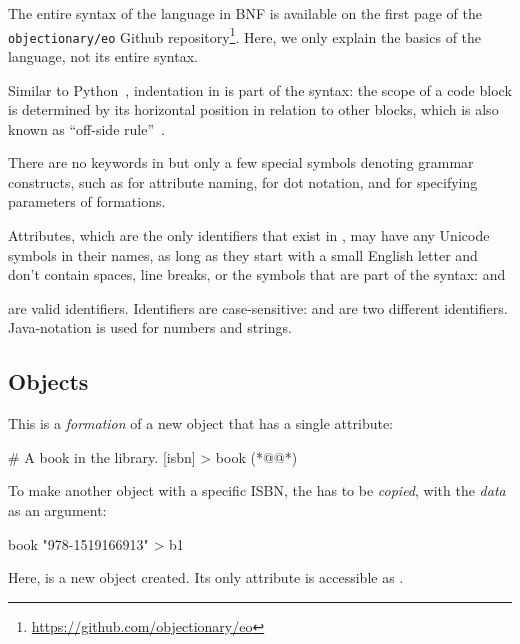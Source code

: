 
The entire syntax of the \eolang{} language in BNF is available on the first page of the
\texttt{objectionary/eo} Github repository\footnote{\url{https://github.com/objectionary/eo}}.
Here, we only explain the basics of the language, not its entire syntax.

Similar to Python~\citep{lutz2013learning}, indentation in \eolang{} is part of the syntax:
the scope of a code block is determined by its horizontal position
in relation to other blocks, which is also known as ``off-side rule''~\citep{landin1966next}.

There are no keywords in \eolang{} but only a few special symbols
denoting grammar constructs, such as \ff{>} for attribute naming,
 for dot notation, and \ff{[]} for specifying parameters of formations.

Attributes, which are the only identifiers that exist in \eolang{}, may have
any Unicode symbols in their names, as long as they start with a small English letter
and don't contain spaces, line breaks, or the symbols that are part of the syntax:
 and
\begin{CJK}{UTF8}{gbsn}
\end{CJK}
 are valid identifiers.
Identifiers are case-sensitive:  and  are two different identifiers.
Java-notation is used for numbers and strings.

\subsection{Objects}

This is a \emph{formation} of a new object  that has a single  attribute:

\begin{ffcode}
# A book in the library.
[isbn] > book (*@\label{ln:book}@*)
\end{ffcode}

To make another object with a specific ISBN, the 
has to be \emph{copied}, with the \emph{data} as an argument:

\begin{ffcode}
book "978-1519166913" > b1
\end{ffcode}

Here,  is a new object created.
Its only attribute is accessible as .

